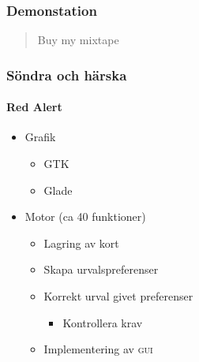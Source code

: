 \documentclass{beamer}
\begin{document}
\begin{frame}
    \frametitle{Demonstation}
    
    \begin{quote}
        Buy my mixtape
    \end{quote}
\end{frame}

\begin{frame}
    \frametitle{Söndra och härska}
    \framesubtitle{Red Alert}
    
    \begin{itemize}
        \item Grafik
         \begin{itemize}
             \item GTK
             \item Glade
            \end{itemize}
        \item Motor (ca 40 funktioner)
        \begin{itemize}
            \item Lagring av kort
            \item Skapa urvalspreferenser
            \item Korrekt urval givet preferenser
            \begin{itemize}
                \item Kontrollera krav
            \end{itemize}
            \item Implementering av \textsc{gui}
        \end{itemize}
    \end{itemize}

\end{frame}
\end{document}
